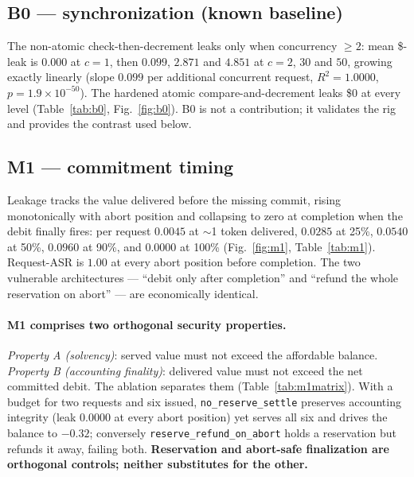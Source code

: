 \documentclass[11pt]{article}
\begin{document}
\subsection{B0 --- synchronization (known baseline)}
The non-atomic check-then-decrement leaks only when concurrency $\ge 2$: mean \$-leak is
$0.000$ at $c{=}1$, then $0.099$, $2.871$ and $4.851$ at $c{=}2$, $30$ and $50$, growing
exactly linearly (slope $0.099$ per additional concurrent request, $R^2=1.0000$,
$p=1.9\times10^{-50}$). The hardened atomic compare-and-decrement leaks \$0 at every
level (Table~\ref{tab:b0}, Fig.~\ref{fig:b0}). B0 is not a contribution; it validates the
rig and provides the contrast used below.

\subsection{M1 --- commitment timing}
\label{sec:m1}
Leakage tracks the value delivered before the missing commit, rising monotonically with
abort position and collapsing to zero at completion when the debit finally fires: per
request $0.0045$ at $\sim$1 token delivered, $0.0285$ at 25\%, $0.0540$ at 50\%,
$0.0960$ at 90\%, and $0.0000$ at 100\% (Fig.~\ref{fig:m1}, Table~\ref{tab:m1}).
Request-ASR is $1.00$ at every abort position before completion. The two vulnerable
architectures --- ``debit only after completion'' and ``refund the whole reservation on
abort'' --- are economically identical.

\paragraph{M1 comprises two orthogonal security properties.}
\begin{sloppypar}
\emph{Property A (solvency)}: served value must not exceed the affordable balance.
\emph{Property B (accounting finality)}: delivered value must not exceed the net
committed debit. The ablation separates them (Table~\ref{tab:m1matrix}). With a budget
for two requests and six issued, \texttt{no\_reserve\_settle} preserves accounting
integrity (leak $0.0000$ at every abort position) yet serves all six and drives the
balance to $-0.32$; conversely \texttt{reserve\_refund\_on\_abort} holds a reservation
but refunds it away, failing both. \textbf{Reservation and abort-safe finalization are
orthogonal controls; neither substitutes for the other.}
\end{sloppypar}
\end{document}

